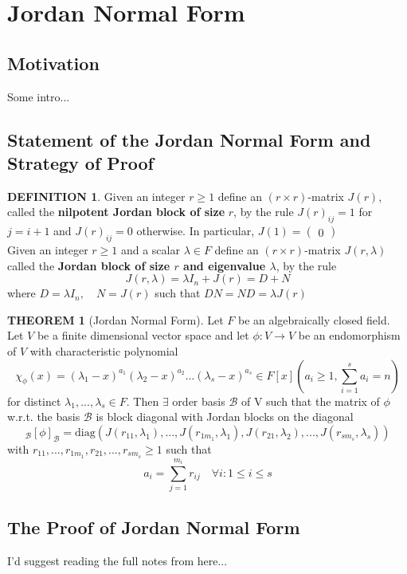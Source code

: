\documentclass[10pt]{article}
\theoremstyle{definition}
\newtheorem{definition}{DEFINITION}[subsection]
\newtheorem{theorem}{THEOREM}[subsection]
\newcommand{\diag}{\text{diag}}
\begin{document}
\section{Jordan Normal Form}
\subsection{Motivation}
Some intro...

\subsection{Statement of the Jordan Normal Form and Strategy of Proof}
\begin{definition}
    Given an integer $r \geq 1$ define an $(r \times r)$-matrix $J(r)$, called the \textbf{nilpotent Jordan block of size} $r$, by the rule $J(r)_{ij} = 1$ for $j = i+1$ and $J(r)_{ij} = 0$ otherwise. In particular, $J(1) = \begin{pmatrix}
        0
    \end{pmatrix}$\\
    Given an integer $r \geq 1$ and a scalar $\lambda \in F$ define an $(r \times r)$-matrix $J(r,\lambda)$ called the \textbf{Jordan block of size $r$ and eigenvalue $\lambda$}, by the rule
    $$J(r,\lambda) = \lambda I_n + J(r) = D + N$$
    where $D = \lambda I_n,\quad N = J(r)$ such that $DN = ND = \lambda J(r)$
\end{definition}

\begin{theorem}[Jordan Normal Form]
    Let $F$ be an algebraically closed field. Let $V$ be a finite dimensional vector space and let $\phi: V \rightarrow V$ be an endomorphism of $V$ with characteristic polynomial
    $$\chi_\phi(x) = (\lambda_1 - x)^{a_1}(\lambda_2 - x)^{a_2}...(\lambda_s - x)^{a_s} \in F[x]\left(a_i \geq 1, \sum_{i=1}^s a_i = n\right)$$
    for distinct $\lambda_1, ..., \lambda_s \in F$. Then $\exists$ order basis $\mathcal{B}$ of V such that the matrix of $\phi$ w.r.t. the basis $\mathcal{B}$ is block diagonal with Jordan blocks on the diagonal
    $$_\mathcal{B}[\phi]_\mathcal{B} = \diag(J(r_{11},\lambda_1),...,J(r_{1m_1},\lambda_1),J(r_{21},\lambda_2),...,J(r_{sm_s},\lambda_s))$$
    with $r_{11},...,r_{1m_1},r_{21},...,r_{sm_s} \geq 1$ such that
    $$a_i = \sum_{j = 1}^{m_i} r_{ij} \quad \forall i: 1 \leq i \leq s $$
\end{theorem}

\subsection{The Proof of Jordan Normal Form}
I'd suggest reading the full notes from here...
\end{document}
